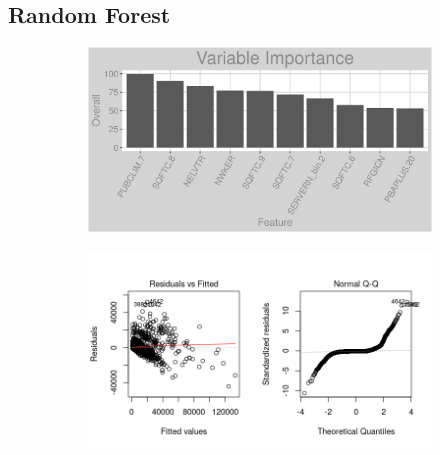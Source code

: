 \subsection{Random Forest}
\label{appendix:electricity:rf}
\begin{figure}[h]
\centering
\begin{subfigure}{1\textwidth}
\centering
\includegraphics[width=.99\textwidth, height=0.3\textheight]{Images/electricity_rf_vars.png}
\end{subfigure}
\begin{subfigure}{1\textwidth}
\centering
\includegraphics[width=.99\textwidth, height=0.475\textheight]{Images/electricity_rf_res_1.png}
\end{subfigure}
\end{figure}
\FloatBarrier
\newpage
